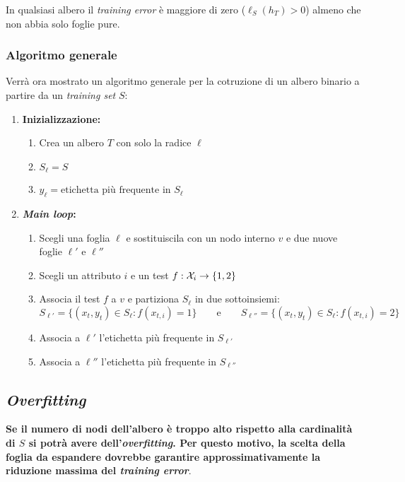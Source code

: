 In qualsiasi albero il \textit{training error} è maggiore di zero ($\ell_S(h_T)>0$)
almeno che non abbia solo foglie pure.

\subsubsection{Algoritmo generale}
Verrà ora mostrato un algoritmo generale per la cotruzione di un albero binario a partire
da un \textit{training set} $S$:

\begin{enumerate}
    \item \textbf{Inizializzazione:}
        \begin{enumerate}
            \item Crea un albero $T$ con solo la radice $\ell$
            \item $S_{\ell} = S$
            \item $y_{\ell} = \text{etichetta più frequente in $S_{\ell}$}$
        \end{enumerate}
    \item \textbf{\textit{Main loop}:}
        \begin{enumerate}
            \item Scegli una foglia $\ell$ e sostituiscila con un nodo interno $v$ e due
                nuove foglie $\ell'$ e $\ell''$
            \item Scegli un attributo $i$ e un test $f:\mathcal{X}_i \rightarrow \{1,2\}$
            \item Associa il test $f$ a $v$ e partiziona $S_{\ell}$ in due sottoinsiemi:
                $$ S_{\ell'}=\{(x_t,y_t) \in S_{\ell} : f(x_{t,i})=1\} \qquad \text{e} 
                \qquad S_{\ell''}=\{(x_t,y_t) \in S_{\ell} : f(x_{t,i})=2\} $$
            \item Associa a $\ell'$ l'etichetta più frequente in $S_{\ell'}$
            \item Associa a $\ell''$ l'etichetta più frequente in $S_{\ell''}$
        \end{enumerate}
\end{enumerate}

\subsection{\textit{Overfitting}}
\textbf{Se il numero di nodi dell'albero è troppo alto rispetto alla cardinalità di $S$ si 
potrà avere dell'\textit{overfitting}. Per questo motivo, la scelta della foglia da
espandere dovrebbe garantire approssimativamente la riduzione massima del \textit{training
error}}.

